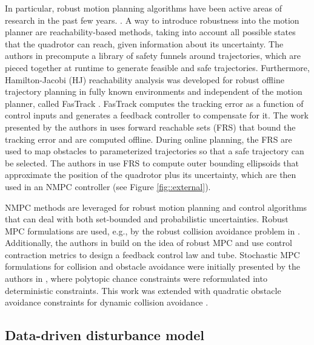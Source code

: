 In particular, robust motion planning algorithms have been active areas of research in the past few years. \cite{kousik2020bridging}. A way to introduce robustness into the motion planner are reachability-based methods, taking into account all possible states that the quadrotor can reach, given information about its uncertainty. The authors in \cite{majumdar2017funnel} precompute a library of safety funnels around trajectories, which are pieced together at runtime to generate feasible and safe trajectories. Furthermore, Hamilton-Jacobi (HJ) reachability analysis was developed for robust offline trajectory planning in fully known environments and independent of the motion planner, called FasTrack \cite{herbert2017fastrack}. FasTrack computes the tracking error as a function of control inputs and generates a feedback controller to compensate for it. The work presented by the authors in \cite{kousik2020bridging} uses forward reachable sets (FRS) that bound the tracking error and are computed offline. During online planning, the FRS are used to map obstacles to parameterized trajectories so that a safe trajectory can be selected. The authors in \cite{wu2021external} use FRS to compute outer bounding ellipsoids that approximate the position of the quadrotor plus its uncertainty, which are then used in an NMPC controller (see Figure \ref{fig::external}).

NMPC methods are leveraged for robust motion planning and control algorithms that can deal with both set-bounded and probabilistic uncertainties. Robust MPC formulations are used, e.g., by the robust collision avoidance problem in \cite{kamel2017linear}. Additionally, the authors in \cite{singh2019robust} build on the idea of robust MPC and use control contraction metrics to design a feedback control law and tube. Stochastic MPC formulations for collision and obstacle avoidance were initially presented by the authors in \cite{blackmore2011chance}, where polytopic chance constraints were reformulated into deterministic constraints. This work was extended with quadratic obstacle avoidance constraints for dynamic collision avoidance \cite{zhu2019chance}. 

\subsection{Data-driven disturbance model}


